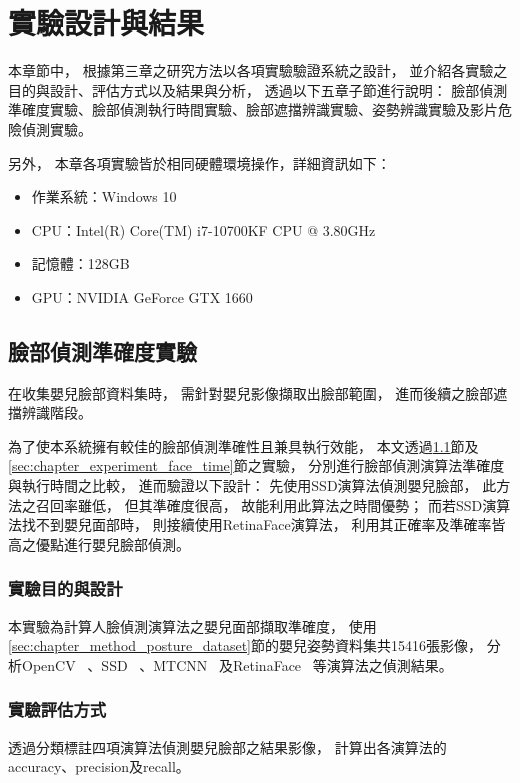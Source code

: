\documentclass[class=NCU_thesis, crop=false]{standalone}
\begin{document}
\chapter{實驗設計與結果}
本章節中，
根據第三章之研究方法以各項實驗驗證系統之設計，
並介紹各實驗之目的與設計、評估方式以及結果與分析，
透過以下五章子節進行說明：
臉部偵測準確度實驗、臉部偵測執行時間實驗、臉部遮擋辨識實驗、姿勢辨識實驗及影片危險偵測實驗。

另外，
本章各項實驗皆於相同硬體環境操作，詳細資訊如下：
\begin{itemize}
    \item 作業系統：Windows 10
    \item CPU：Intel(R) Core(TM) i7-10700KF CPU @ 3.80GHz
    \item 記憶體：128GB
    \item GPU：NVIDIA GeForce GTX 1660
\end{itemize}

\section{臉部偵測準確度實驗}
\label{sec:chapter_experiment_face_accuracy}
在收集嬰兒臉部資料集時，
需針對嬰兒影像擷取出臉部範圍，
進而後續之臉部遮擋辨識階段。

為了使本系統擁有較佳的臉部偵測準確性且兼具執行效能，
本文透過\ref{sec:chapter_experiment_face_accuracy}節及\ref{sec:chapter_experiment_face_time}節之實驗，
分別進行臉部偵測演算法準確度與執行時間之比較，
進而驗證以下設計：
先使用SSD演算法偵測嬰兒臉部，
此方法之召回率雖低，
但其準確度很高，
故能利用此算法之時間優勢；
而若SSD演算法找不到嬰兒面部時，
則接續使用RetinaFace演算法，
利用其正確率及準確率皆高之優點進行嬰兒臉部偵測。

\subsection{實驗目的與設計}
本實驗為計算人臉偵測演算法之嬰兒面部擷取準確度，
使用\ref{sec:chapter_method_posture_dataset}節的嬰兒姿勢資料集共15416張影像，
分析OpenCV~\cite{goyal_face_2017}
、SSD~\cite{ye_face_2021}
、MTCNN~\cite{zhang_joint_2016}
及RetinaFace~\cite{deng_retinaface_2020}
等演算法之偵測結果。

\subsection{實驗評估方式}
透過分類標註四項演算法偵測嬰兒臉部之結果影像，
計算出各演算法的accuracy、precision及recall。
\end{document}
